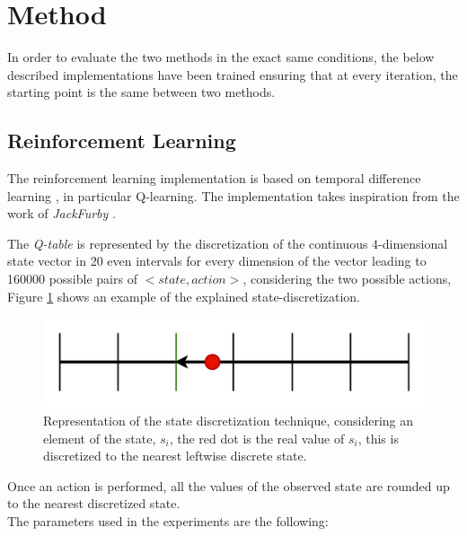 \section{Method}
In order to evaluate the two methods in the exact same conditions, the below described implementations have been trained ensuring that at every iteration, the starting point is the same between two methods.


\subsection{Reinforcement Learning}
The reinforcement learning implementation is based on temporal difference learning \cite{sutton1998temporal}, 
in particular Q-learning.
The implementation takes inspiration from the work of \textit{JackFurby} \cite{JackFurbyCartPole}.

The \textit{Q-table} is represented by the discretization of the continuous 4-dimensional state vector in 20 even intervals for every dimension of the vector leading to 160000 possible pairs of $<state,action>$, considering the two possible actions, Figure \ref{figDISC} shows an example of the explained state-discretization.

\begin{figure}[H]
	\centering
	\includegraphics [scale = 0.2]{Images/state_discretization.png}
	\caption{Representation of the state discretization technique, considering an element of the state, $s_i$, the red dot is the real value of $s_i$, this is discretized to the nearest leftwise discrete state.}
	\label{figDISC}
\end{figure}

Once an action is performed, all the values of the observed state are rounded up to the nearest discretized state.\\
The parameters used in the experiments are the following:


